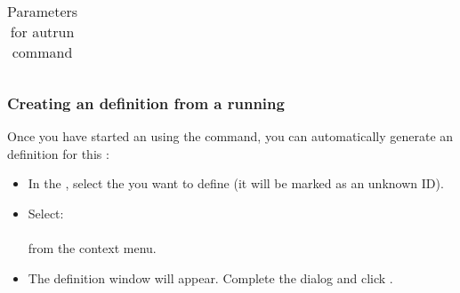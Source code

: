 \begin{enumerate}
\begin{table}[h]
\begin{tabular}{|l|l|}
	\end{tabular}
	\caption{Parameters for autrun command}
\end{table}
\end{enumerate}

\subsubsection{Creating an \gdaut{} definition from a running \gdaut{}}
\label{createAUTDef}
Once you have started an \gdaut{} using the  command, you can automatically generate an \gdaut{} definition  for this \gdaut{}:

\begin{itemize}
\item In the \gdrunautview{}, select the \gdaut{} you want to define (it will be marked as an unknown \gdaut{} ID).
\item Select:\\
 \\
from the context menu.
\item The \gdaut{} definition window will appear. Complete the dialog  and click .
\end{itemize}
